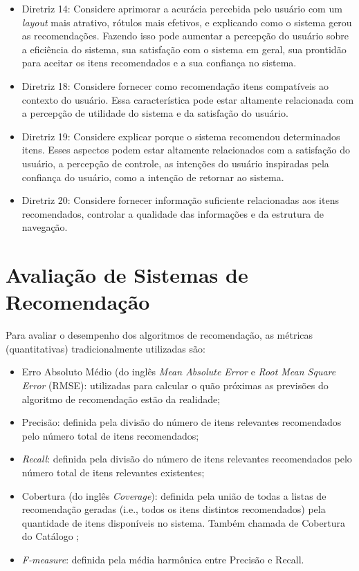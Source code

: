 \begin{itemize}
\item Diretriz 14: Considere aprimorar a acurácia percebida pelo usuário com um \textit{layout} mais atrativo, rótulos mais
efetivos, e explicando como o sistema gerou as recomendações. Fazendo isso pode aumentar a percepção do usuário sobre a
eficiência do sistema, sua satisfação com o sistema em geral, sua prontidão para aceitar os itens recomendados e a sua
confiança no sistema.
\item Diretriz 18: Considere fornecer como recomendação itens compatíveis ao contexto do usuário. Essa característica
pode estar altamente relacionada com a percepção de utilidade do sistema e da satisfação do usuário.
\item Diretriz 19: Considere explicar porque o sistema recomendou determinados itens. Esses aspectos podem estar
altamente relacionados com a satisfação do usuário, a percepção de controle, as intenções do usuário inspiradas pela
confiança do usuário, como a intenção de retornar ao sistema.
\item Diretriz 20: Considere fornecer informação suficiente relacionadas aos itens recomendados, controlar a qualidade
das informações e da estrutura de navegação.
\end{itemize}

\section{Avaliação de Sistemas de Recomendação}\label{section:fundamentacao-avaliacao-sr}

Para avaliar o desempenho dos algoritmos de recomendação, as métricas (quantitativas) tradicionalmente utilizadas são:

\begin{itemize}
\item Erro Absoluto Médio (do inglês \textit{Mean Absolute Error} e \textit{Root Mean Square Error} (RMSE): utilizadas
para calcular o quão próximas as previsões do algoritmo de recomendação estão da realidade;
\item Precisão: definida pela divisão do número de itens relevantes recomendados pelo número total de itens recomendados;
\item \textit{Recall}: definida pela divisão do número de itens relevantes recomendados pelo número total de itens
relevantes existentes;
\item Cobertura (do inglês \textit{Coverage}): definida pela união de todas a listas de recomendação geradas (i.e., todos os itens
distintos recomendados) pela quantidade de itens disponíveis no sistema. Também chamada de Cobertura do Catálogo \cite{ge2010beyond};
\item \textit{F-measure}: definida pela média harmônica entre Precisão e Recall.
\end{itemize}

